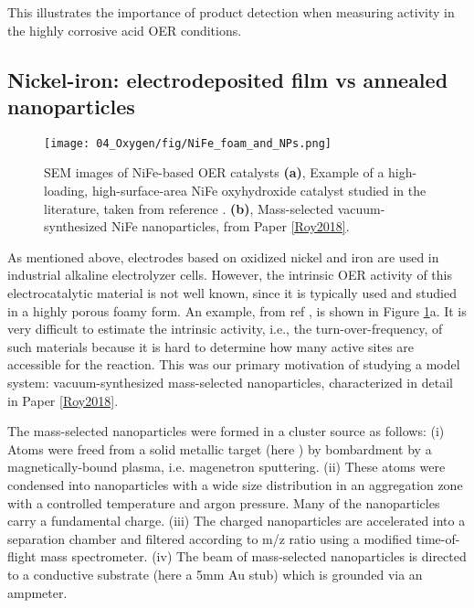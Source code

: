 This illustrates the importance of product detection when measuring activity in the highly corrosive acid OER conditions.

\subsection{Nickel-iron: electrodeposited film vs annealed nanoparticles}\label{subsec:NiFe}

\begin{figure}[h]
	\centering
	\texttt{[image: 04\_Oxygen/fig/NiFe\_foam\_and\_NPs.png]}
	\caption{SEM images of NiFe-based OER catalysts \textbf{(a)}, Example of a high-loading, high-surface-area NiFe oxyhydroxide catalyst studied in the literature, taken from reference . \textbf{(b)}, Mass-selected vacuum-synthesized NiFe nanoparticles, from Paper \ref{Roy2018}.}
	\label{fig:NiFe_foam_and_NPs}
\end{figure}

As mentioned above, electrodes based on oxidized nickel and iron are used in industrial alkaline electrolyzer cells. However, the intrinsic OER activity of this electrocatalytic material is not well known, since it is typically used and studied in a highly porous foamy form\cite{Dionigi2016b}. An example, from ref , is shown in Figure \ref{fig:NiFe_foam_and_NPs}a. It is very difficult to estimate the intrinsic activity, i.e., the turn-over-frequency, of such materials because it is hard to determine how many active sites are accessible for the reaction. This was our primary motivation of studying a model system: vacuum-synthesized mass-selected  nanoparticles, characterized in detail in Paper \ref{Roy2018}.

The mass-selected nanoparticles were formed in a cluster source as follows\cite{VonIssendorff1999}: (i) Atoms were freed from a solid metallic target (here ) by bombardment by a magnetically-bound plasma, i.e. magenetron sputtering. (ii) These atoms were condensed into nanoparticles with a wide size distribution in an aggregation zone with a controlled temperature and argon pressure. Many of the nanoparticles carry a fundamental charge. (iii) The charged nanoparticles are accelerated into a separation chamber and filtered according to m/z ratio using a modified time-of-flight mass spectrometer. (iv) The beam of mass-selected nanoparticles is directed to a conductive substrate (here a 5mm Au stub) which is grounded via an ampmeter. 

